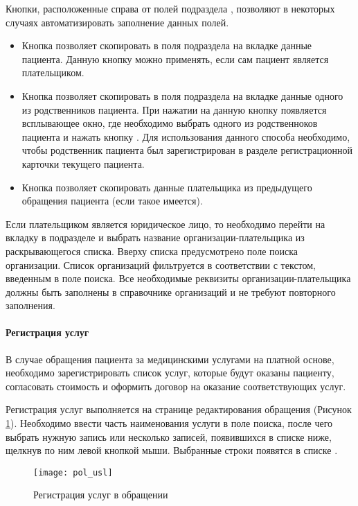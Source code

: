 {Кнопки, расположенные справа от полей подраздела , позволяют в некоторых случаях автоматизировать заполнение данных полей. 
\begin{itemize}
	\item Кнопка  позволяет скопировать в поля подраздела  на вкладке  данные пациента. Данную кнопку можно применять, если сам пациент является плательщиком.
	\item Кнопка  позволяет скопировать в поля подраздела  на вкладке  данные одного из родственников пациента. При нажатии на данную кнопку появляется всплывающее окно, где необходимо выбрать одного из родственноков пациента и нажать кнопку . Для использования данного способа необходимо, чтобы родственник пациента был зарегистрирован в разделе  регистрационной карточки текущего пациента.
	\item Кнопка  позволяет скопировать данные плательщика из предыдущего обращения пациента (если такое имеется).
\end{itemize} 

Если плательщиком является юридическое лицо, то необходимо перейти на вкладку  в подразделе  и выбрать название организации-плательщика из раскрывающегося списка. Вверху списка предусмотрено поле поиска организации. Список организаций фильтруется в соответствии с текстом, введенным в поле поиска. Все необходимые реквизиты организации-плательщика должны быть заполнены в справочнике организаций и не требуют повторного заполнения.

\paragraph{Регистрация услуг} \label{ev_regusl}

В случае обращения пациента за медицинскими услугами на платной основе, необходимо зарегистрировать список услуг, которые будут оказаны пациенту, согласовать стоимость и оформить договор на оказание соответствующих услуг.

Регистрация услуг выполняется на странице редактирования обращения (Рисунок \ref{img_pol_usl}). Необходимо ввести часть наименования услуги в поле поиска, после чего выбрать нужную запись или несколько записей, появившихся в списке ниже, щелкнув по ним левой кнопкой мыши. Выбранные строки появятся в списке .

\begin{figure}[ht]\centering
	\texttt{[image: pol\_usl]}
	\caption{Регистрация услуг в обращении}
	\label{img_pol_usl}
\end{figure}

}
